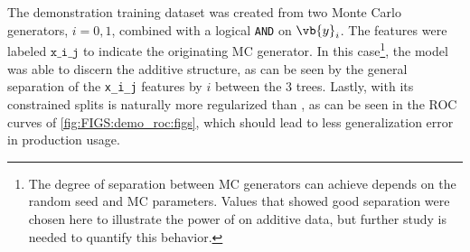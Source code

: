 The demonstration training dataset was created from two Monte Carlo generators, $i=0,1$,
combined with a logical \texttt{AND} on $\vb{y}_{i}$.
The features were labeled $\texttt{x\_i\_j}$ to indicate the originating MC generator.
In this case\footnote{The degree of separation between MC generators
\figs can achieve depends on the random seed and MC parameters.
Values that showed good separation were chosen here to illustrate
the power of \figs on additive data,
but further study is needed to quantify this behavior.},
the \figs model was able to discern the additive structure,
as can be seen by the general separation of the \texttt{x\_i\_j} features by $i$ between the \num{3} trees.
Lastly, with its constrained splits \figs is naturally more regularized than \xgboost,
as can be seen in the ROC curves of \cref{fig:FIGS:demo_roc:figs},
which should lead to less generalization error in production usage.

\newpage


